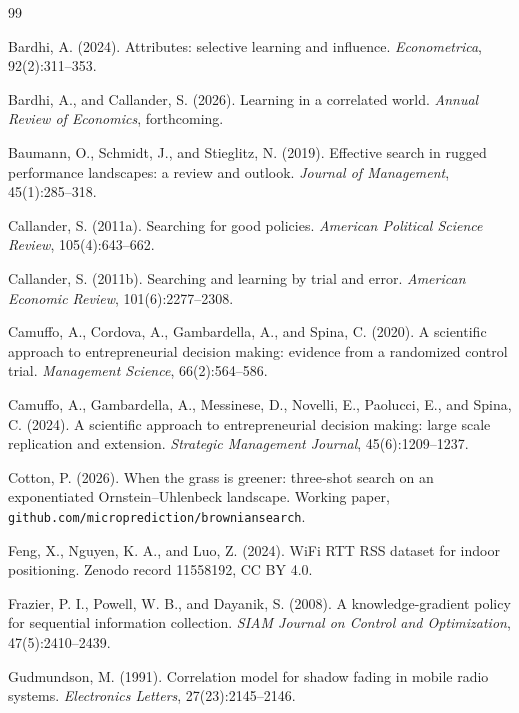 \documentclass[11pt]{article}
\theoremstyle{itheads}
\begin{document}
\begin{thebibliography}{99}

Bardhi, A. (2024).
Attributes: selective learning and influence.
\emph{Econometrica}, 92(2):311--353.

Bardhi, A., and Callander, S. (2026).
Learning in a correlated world.
\emph{Annual Review of Economics}, forthcoming.

Baumann, O., Schmidt, J., and Stieglitz, N. (2019).
Effective search in rugged performance landscapes: a review and
outlook.
\emph{Journal of Management}, 45(1):285--318.

Callander, S. (2011a).
Searching for good policies.
\emph{American Political Science Review}, 105(4):643--662.

Callander, S. (2011b).
Searching and learning by trial and error.
\emph{American Economic Review}, 101(6):2277--2308.

Camuffo, A., Cordova, A., Gambardella, A., and Spina, C. (2020).
A scientific approach to entrepreneurial decision making: evidence
from a randomized control trial.
\emph{Management Science}, 66(2):564--586.

Camuffo, A., Gambardella, A., Messinese, D., Novelli, E., Paolucci,
E., and Spina, C. (2024).
A scientific approach to entrepreneurial decision making: large scale
replication and extension.
\emph{Strategic Management Journal}, 45(6):1209--1237.

Cotton, P. (2026).
When the grass is greener: three-shot search on an exponentiated
Ornstein--Uhlenbeck landscape.
Working paper, \texttt{github.com/microprediction/browniansearch}.

Feng, X., Nguyen, K. A., and Luo, Z. (2024).
WiFi RTT RSS dataset for indoor positioning.
Zenodo record 11558192, CC BY 4.0.

Frazier, P. I., Powell, W. B., and Dayanik, S. (2008).
A knowledge-gradient policy for sequential information collection.
\emph{SIAM Journal on Control and Optimization}, 47(5):2410--2439.

Gudmundson, M. (1991).
Correlation model for shadow fading in mobile radio systems.
\emph{Electronics Letters}, 27(23):2145--2146.


\end{thebibliography}
\end{document}
